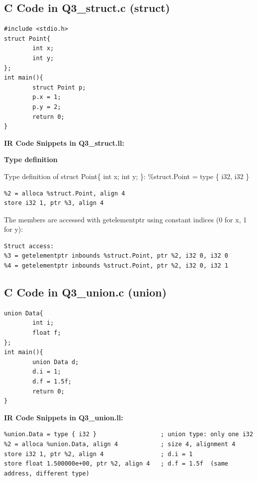 \documentclass[11pt,a4paper]{article}
\begin{document}
\subsection{C Code in Q3\_struct.c (struct)}

\begin{lstlisting}
#include <stdio.h>
struct Point{
        int x;
        int y;
};
int main(){
        struct Point p;
        p.x = 1;
        p.y = 2;
        return 0;
}
\end{lstlisting}

\medskip\noindent\textbf{IR Code Snippets in Q3\_struct.ll:}\par\nopagebreak[4]

\textbf{Type definition}

Type definition of struct Point\{ int x; int y; \}: \%struct.Point = type \{ i32, i32 \}

\begin{lstlisting}
%2 = alloca %struct.Point, align 4
store i32 1, ptr %3, align 4
\end{lstlisting}

The members are accessed with getelementptr using constant indices (0 for x, 1 for y):

\begin{lstlisting}
Struct access:
%3 = getelementptr inbounds %struct.Point, ptr %2, i32 0, i32 0
%4 = getelementptr inbounds %struct.Point, ptr %2, i32 0, i32 1
\end{lstlisting}

\subsection{C Code in Q3\_union.c (union)}

\begin{lstlisting}
union Data{
        int i;
        float f;
};
int main(){
        union Data d;
        d.i = 1;
        d.f = 1.5f;
        return 0;
}
\end{lstlisting}

\medskip\noindent\textbf{IR Code Snippets in Q3\_union.ll:}\par

\begin{lstlisting}
%union.Data = type { i32 }                  ; union type: only one i32
%2 = alloca %union.Data, align 4            ; size 4, alignment 4
store i32 1, ptr %2, align 4                ; d.i = 1
store float 1.500000e+00, ptr %2, align 4   ; d.f = 1.5f  (same address, different type)
\end{lstlisting}
\end{document}
